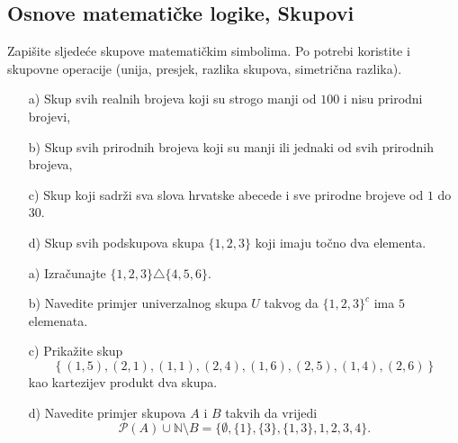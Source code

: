 \subsection*{Osnove matematičke logike, Skupovi}
\begin{exercise} Zapišite sljedeće skupove matematičkim simbolima. Po potrebi koristite i skupovne operacije (unija, presjek, razlika skupova, simetrična razlika).
\begin{itemize}
\item[a)] Skup svih realnih brojeva koji su strogo manji od $100$ i nisu prirodni brojevi,
\item[b)] Skup svih prirodnih brojeva koji su manji ili jednaki od svih prirodnih brojeva,
\item[c)] Skup koji sadrži sva slova hrvatske abecede i sve prirodne brojeve od $1$ do $30$.
\item[d)] Skup svih podskupova skupa $\{1, 2, 3\}$ koji imaju točno dva elementa.
\end{itemize}
\end{exercise}
\begin{exercise} \textbf{}
\begin{itemize}
\item[a)] Izračunajte $\{1, 2, 3\}\triangle\{4, 5, 6\}$.
\item[b)] Navedite primjer univerzalnog skupa $U$ takvog da $\{1, 2, 3\}^c$ ima $5$ elemenata.
\item[c)] Prikažite skup
$$\left\{(1, 5), (2, 1), (1, 1), (2, 4), (1, 6), (2, 5), (1, 4), (2, 6)\right\}$$
kao kartezijev produkt dva skupa.
\item[d)] Navedite primjer skupova $A$ i $B$ takvih da vrijedi $$\mathcal{P}(A)\cup \mathbb{N}\setminus B=\{\emptyset, \{1\}, \{3\}, \{1, 3\}, 1, 2,3, 4\}.$$
\end{itemize}
\end{exercise}
